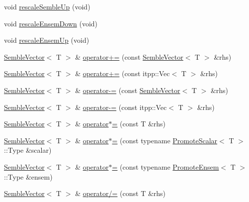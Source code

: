\begin{DoxyCompactItemize}
\item 
void \mbox{\hyperlink{structSEMBLE_1_1SembleVector_aa9fbae5c5028eb49709043362099cb03}{rescale\+Semble\+Up}} (void)
\item 
void \mbox{\hyperlink{structSEMBLE_1_1SembleVector_acda114b0659e31c0130b4b6eb0d4701d}{rescale\+Ensem\+Down}} (void)
\item 
void \mbox{\hyperlink{structSEMBLE_1_1SembleVector_ade3ccfd44ba282c06bf32c0a1c800d2f}{rescale\+Ensem\+Up}} (void)
\item 
\mbox{\hyperlink{structSEMBLE_1_1SembleVector}{Semble\+Vector}}$<$ T $>$ \& \mbox{\hyperlink{structSEMBLE_1_1SembleVector_ac40d91d7822b52c779763c6812f53a56}{operator+=}} (const \mbox{\hyperlink{structSEMBLE_1_1SembleVector}{Semble\+Vector}}$<$ T $>$ \&rhs)
\item 
\mbox{\hyperlink{structSEMBLE_1_1SembleVector}{Semble\+Vector}}$<$ T $>$ \& \mbox{\hyperlink{structSEMBLE_1_1SembleVector_a33a63a1691d5e8b6c10bf355b74ff568}{operator+=}} (const itpp\+::\+Vec$<$ T $>$ \&rhs)
\item 
\mbox{\hyperlink{structSEMBLE_1_1SembleVector}{Semble\+Vector}}$<$ T $>$ \& \mbox{\hyperlink{structSEMBLE_1_1SembleVector_aa425a7c40009b81492d52d77de3f9eab}{operator-\/=}} (const \mbox{\hyperlink{structSEMBLE_1_1SembleVector}{Semble\+Vector}}$<$ T $>$ \&rhs)
\item 
\mbox{\hyperlink{structSEMBLE_1_1SembleVector}{Semble\+Vector}}$<$ T $>$ \& \mbox{\hyperlink{structSEMBLE_1_1SembleVector_a9bc1c3ebd9adcc1c05287072b82f12a7}{operator-\/=}} (const itpp\+::\+Vec$<$ T $>$ \&rhs)
\item 
\mbox{\hyperlink{structSEMBLE_1_1SembleVector}{Semble\+Vector}}$<$ T $>$ \& \mbox{\hyperlink{structSEMBLE_1_1SembleVector_a4f0bf3e46c82699c75a57ba48af0bf77}{operator$\ast$=}} (const T \&rhs)
\item 
\mbox{\hyperlink{structSEMBLE_1_1SembleVector}{Semble\+Vector}}$<$ T $>$ \& \mbox{\hyperlink{structSEMBLE_1_1SembleVector_adcb53ca0c494cd2604ec9bec9e95f74a}{operator$\ast$=}} (const typename \mbox{\hyperlink{structSEMBLE_1_1PromoteScalar}{Promote\+Scalar}}$<$ T $>$\+::Type \&scalar)
\item 
\mbox{\hyperlink{structSEMBLE_1_1SembleVector}{Semble\+Vector}}$<$ T $>$ \& \mbox{\hyperlink{structSEMBLE_1_1SembleVector_aa61633310e85cdb57bac352a2cf8fd96}{operator$\ast$=}} (const typename \mbox{\hyperlink{structSEMBLE_1_1PromoteEnsem}{Promote\+Ensem}}$<$ T $>$\+::Type \&ensem)
\item 
\mbox{\hyperlink{structSEMBLE_1_1SembleVector}{Semble\+Vector}}$<$ T $>$ \& \mbox{\hyperlink{structSEMBLE_1_1SembleVector_aaecfe4497a8c0414d775295f3041ec08}{operator/=}} (const T \&rhs)

\end{DoxyCompactItemize}
